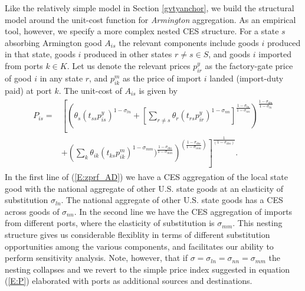 \documentclass{ejb}
\begin{document}
Like the relatively simple model in Section \ref{gvtyanchor}, we build
the structural model around the unit-cost function for
\emph{Armington} aggregation.  As an empirical tool, however, we
specify a more complex nested CES structure.  For a state $s$ absorbing
Armington good $A_{is}$ the relevant components include goods $i$
produced in that state, goods $i$ produced in other states $r \neq s
\in S$, and goods $i$ imported from ports $k \in K$.  Let us denote
the relevant prices $p^y_{ir}$ as the factory-gate price of good $i$
in any state $r$, and $p^m_{ik}$ as the price of import $i$ landed
(import-duty paid) at port $k$.  The unit-cost of $A_{is}$ is given by
\begin{align}
\begin{split}
P_{is} =& \left[\left(\theta_{s}
(t_{ss} p^y_{is})^{1-\sigma_{ln}}+ 
                \left[\sum_{r \neq s} 
		\theta_{r} 
		(t_{rs}
		p^y_{ir})^{1-\sigma_{nn}}
		\right]^{\frac{1-\sigma_{ln}}{1-\sigma_{nn}}} 
\right)^{\frac{1-\sigma_{dm}}{1-\sigma_{ln}}} \right.\\
&\left.+ 
\left(\sum_k 
	\theta_{ik} 
		(t_{ks}
		p^m_{ik})^{1-\sigma_{mm}})^{\frac{1-\sigma_{dm}}{1-\sigma_{mm}}}
\right)^{\left(\frac{1-\sigma_{dm}}{1-\sigma_{mm}}\right)}
\right]^{\frac{1}{(1-\sigma_{dm})}}.
\end{split}
\label{E:zprf_AD}
\end{align}
In the first line of (\ref{E:zprf_AD}) we have a CES aggregation of the
local state good with the national aggregate of other U.S. state
goods at an elasticity of substitution $\sigma_{ln}$.  The national
aggregate of other U.S. state goods has a CES across goods of
$\sigma_{nn}$.  In the second line we have the CES aggregation of imports
from different ports, where the elasticity of substitution is
$\sigma_{mm}$.  This nesting structure gives us considerable flexiblity
in terms of different substitution opportunities among the various
components, and facilitates our ability to perform sensitivity
analysis.  Note, however, that if $\sigma =
\sigma_{ln}=\sigma_{nn}=\sigma_{mm}$ the nesting collapses and we
revert to the simple price index suggested in equation (\ref{E:P})
elaborated with ports as additional sources and destinations.
\end{document}
